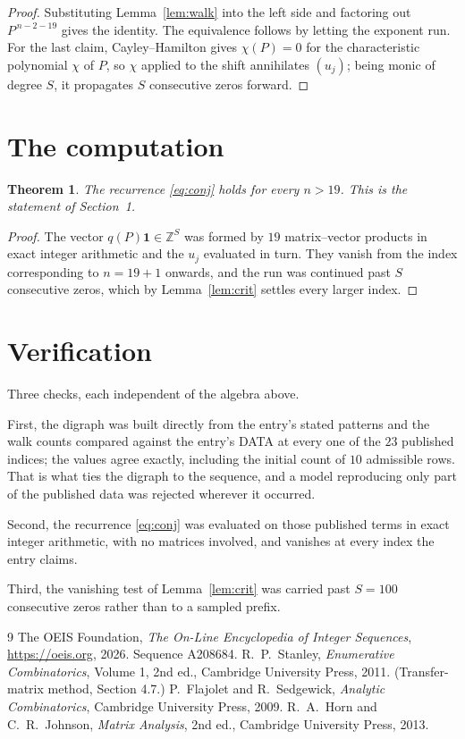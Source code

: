 \documentclass[11pt,a4paper]{article}
\theoremstyle{plain}
\newtheorem{theorem}{Theorem}
\theoremstyle{definition}
\begin{document}
\begin{proof}
Substituting Lemma~\ref{lem:walk} into the left side and factoring out
$P^{\,n-2-19}$ gives the identity. The equivalence follows by letting the exponent
run. For the last claim, Cayley--Hamilton gives $\chi(P)=0$ for the characteristic
polynomial $\chi$ of $P$, so $\chi$ applied to the shift annihilates $(u_j)$; being monic of
degree $S$, it propagates $S$ consecutive zeros forward.
\end{proof}

\section{The computation}

\begin{theorem}
The recurrence \eqref{eq:conj} holds for every $n>19$. This is the statement of
Section~1.
\end{theorem}

\begin{proof}
The vector $q(P)\mathbf{1}\in\mathbb{Z}^{S}$ was formed by $19$ matrix--vector
products in exact integer arithmetic and the $u_j$ evaluated in turn. They vanish from the
index corresponding to $n=19+1$ onwards, and the run was continued past $S$ consecutive
zeros, which by Lemma~\ref{lem:crit} settles every larger index.
\end{proof}

\section{Verification}

Three checks, each independent of the algebra above.

First, the digraph was built directly from the entry's stated patterns and the walk counts
compared against the entry's DATA at every one of the $23$ published indices; the
values agree exactly, including the initial count of $10$ admissible rows. That is
what ties the digraph to the sequence, and a model reproducing only part of the published
data was rejected wherever it occurred.

Second, the recurrence \eqref{eq:conj} was evaluated on those published terms in exact
integer arithmetic, with no matrices involved, and vanishes at every index the entry claims.

Third, the vanishing test of Lemma~\ref{lem:crit} was carried past $S=100$ consecutive
zeros rather than to a sampled prefix.

\begin{thebibliography}{9}
 The OEIS Foundation, \emph{The On-Line Encyclopedia of Integer
Sequences}, \url{https://oeis.org}, 2026. Sequence A208684.
 R.~P.~Stanley, \emph{Enumerative Combinatorics}, Volume 1, 2nd ed.,
Cambridge University Press, 2011. (Transfer-matrix method, Section 4.7.)
 P.~Flajolet and R.~Sedgewick, \emph{Analytic Combinatorics}, Cambridge
University Press, 2009.
 R.~A.~Horn and C.~R.~Johnson, \emph{Matrix Analysis}, 2nd ed., Cambridge
University Press, 2013.
\end{thebibliography}
\end{document}
